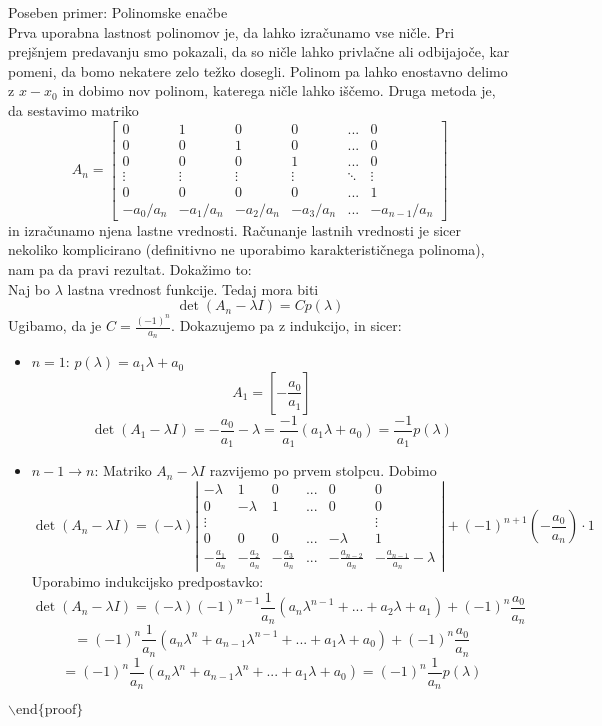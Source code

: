 \documentclass[a4paper]{article}
\begin{document}
Poseben primer: Polinomske enačbe \\
Prva uporabna lastnost polinomov je, da lahko izračunamo vse ničle. Pri prejšnjem predavanju smo pokazali, da so ničle lahko privlačne ali odbijajoče, kar pomeni, da bomo nekatere zelo težko dosegli.
Polinom pa lahko enostavno delimo z $x - x_0$ in dobimo nov polinom, katerega ničle lahko iščemo.
Druga metoda je, da sestavimo matriko
$$A_n = \begin{bmatrix}
    0 & 1 & 0 & 0 & ... & 0 \\
    0 & 0 & 1 & 0 & ... & 0 \\
    0 & 0 & 0 & 1 & ... & 0 \\
    \vdots & \vdots & \vdots &\vdots & \ddots & \vdots \\
    0 & 0 & 0 & 0 & ... & 1 \\
    -a_0/a_n & -a_1/a_n & -a_2/a_n & -a_3/a_n & ... & -a_{n-1}/a_n
\end{bmatrix}$$
in izračunamo njena lastne vrednosti. Računanje lastnih vrednosti je sicer nekoliko komplicirano (definitivno ne uporabimo karakterističnega polinoma), nam pa da pravi rezultat. Dokažimo to: \\
Naj bo $\lambda$ lastna vrednost funkcije. Tedaj mora biti $$\det (A_n - \lambda I) = C p(\lambda)$$
Ugibamo, da je $\displaystyle{C = \frac{(-1)^n}{a_n}}$. Dokazujemo pa z indukcijo, in sicer:
\begin{itemize}
    \item $n=1$: $p(\lambda) = a_1 \lambda + a_0$ \\
    $$A_1 = \left[-\frac{a_0}{a_1}\right]$$
    $$\det (A_1 - \lambda I) = -\frac{a_0}{a_1} - \lambda = \frac{-1}{a_1}\left(a_1 \lambda + a_0\right) = \frac{-1}{a_1}p(\lambda)$$
    \item $n -1 \to n$: Matriko $A_n - \lambda I$ razvijemo po prvem stolpcu. Dobimo $$\det(A_n - \lambda I) = (-\lambda)\left|\begin{matrix}-\lambda & 1 & 0 & ... & 0 & 0 \\ 0 & -\lambda & 1 & ... & 0 & 0 \\ \vdots &&&&& \vdots \\ 0 & 0 & 0 & ... & -\lambda & 1 \\ -\frac{a_1}{a_n} & -\frac{a_2}{a_n} & -\frac{a_3}{a_n} & ... & -\frac{a_{n-2}}{a_n} & -\frac{a_{n-1}}{a_n} - \lambda \end{matrix}\right| + (-1)^{n+1}\left(-\frac{a_0}{a_n}\right)\cdot 1$$ 
    Uporabimo indukcijsko predpostavko: $$\det (A_n - \lambda I) = (-\lambda) (-1)^{n-1} \frac{1}{a_n}\left(a_n\lambda^{n-1} + ... + a_2 \lambda + a_1\right) + (-1)^n\frac{a_0}{a_n}$$
    $$= (-1)^n\frac{1}{a_n}(a_n\lambda^n + a_{n-1}\lambda^{n-1} + ... + a_1\lambda + a_0) + (-1)^n \frac{a_0}{a_n}$$
    $$= (-1)^n \frac{1}{a_n}(a_n\lambda^n + a_{n-1}\lambda^n + ... + a_1\lambda + a_0) = (-1)^n\frac{1}{a_n}p(\lambda)$$
\end{itemize}
\begin{math}\backslash\text{end}\{\text{proof}\}\end{math} \\
\end{document}

